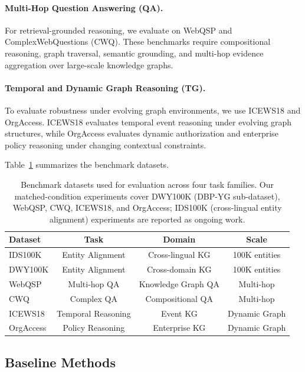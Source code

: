 \documentclass[sigconf,review,anonymous]{acmart}
\begin{document}
\paragraph{Multi-Hop Question Answering (QA).}
For retrieval-grounded reasoning, we evaluate on WebQSP and ComplexWebQuestions (CWQ). These benchmarks require compositional reasoning, graph traversal, semantic grounding, and multi-hop evidence aggregation over large-scale knowledge graphs.

\paragraph{Temporal and Dynamic Graph Reasoning (TG).}
To evaluate robustness under evolving graph environments, we use ICEWS18 and OrgAccess. ICEWS18 evaluates temporal event reasoning under evolving graph structures, while OrgAccess evaluates dynamic authorization and enterprise policy reasoning under changing contextual constraints.

Table~\ref{tab:datasets} summarizes the benchmark datasets.

\begin{table}[t]
\centering
\small
\caption{Benchmark datasets used for evaluation across four task families. Our matched-condition experiments cover DWY100K (DBP-YG sub-dataset), WebQSP, CWQ, ICEWS18, and OrgAccess; IDS100K (cross-lingual entity alignment) experiments are reported as ongoing work.}
\label{tab:datasets}
\begin{tabular}{lccc}
\toprule
Dataset & Task & Domain & Scale \\
\midrule
IDS100K & Entity Alignment & Cross-lingual KG & 100K entities \\
DWY100K & Entity Alignment & Cross-domain KG & 100K entities \\
WebQSP & Multi-hop QA & Knowledge Graph QA & Multi-hop \\
CWQ & Complex QA & Compositional QA & Multi-hop \\
ICEWS18 & Temporal Reasoning & Event KG & Dynamic Graph \\
OrgAccess & Policy Reasoning & Enterprise KG & Dynamic Graph \\
\bottomrule
\end{tabular}
\end{table}

\subsection{Baseline Methods}
\end{document}
